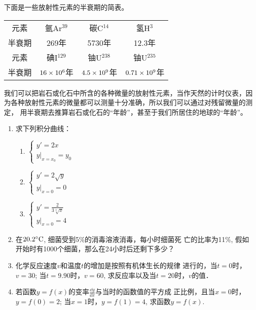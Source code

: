 下面是一些放射性元素的半衰期的简表。

\begin{center}
    \begin{tabular}{c|ccc}
    \hline
        元素 & 氩Ar$^{39}$ &碳C$^{14}$&氢H$^3$  \\
    半衰期 & 269年& 5730年& 12.3年 \\
    \hline
    元素 & 碘I$^{129}$ &铀U$^{238}$& 铀U$^{235}$ \\
    半衰期 &  $16\times10^6$年& $4.5\times 10^9$年& $0.71\times 10^9$年\\
    \hline
            \end{tabular}
    \end{center}

我们可以把岩石或化石中所含的各种微量的放射性元素，当作天然的计时仪表，因为各种放射性元素的微量都可以测量十分准确，所以我们可以通过对残留微量的测定，
用半衰期去推算岩石或化石的“年龄”，甚至于我们所居住的地球的“年龄”。

\begin{ex}
\begin{enumerate}
    \item 求下列积分曲线：
\begin{multicols}{2}
\begin{enumerate}
    \item $\begin{cases}
        y'=2x\\
        y|_{x=x_0}=y_0
    \end{cases}$
    \item $\begin{cases}
        y'=2\sqrt{y}\\
        y|_{x=0}=0
    \end{cases}$
    \item $\begin{cases}
        y'=\frac{2}{3\sqrt[3]{x}}\\
        y|_{x=0}=4
    \end{cases}$
\end{enumerate}
\end{multicols}
\item 在$20.2^{\circ}{\rm C}$, 细菌受到5\%的消毒溶液消毒，每小时细菌死
    亡的比率为11\%, 假如开始时有1000个细菌，那么在24小时后还剩下多少？
    \item 化学反应速度$v$和温度$t$的增加是按照有机体生长的规律
    进行的，当$t=0$时，$v=30$; 当$t=9.90$时，$v=60$, 求反应率以及当$t=20$时，$v$的值．
\item 若函数$y=f(x)$的变率$\frac{\dd y}{\dd x}$与当时的函数值的平方成
    正比例，且当$x=0$时，$y=f(0)=2$; 当$x=1$时，$y=f(1)=4$, 求函数$y=f(x)$.
\end{enumerate} 
\end{ex}

